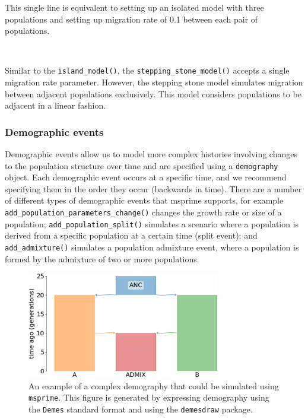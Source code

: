 \documentclass[graybox]{svmult}
\newcommand{\msprime}[0]{\texttt{msprime}}
\begin{document}
This single line is equivalent to setting up an isolated model with three populations
and setting up migration rate of 0.1 between each pair of populations.

\label{stepping-stone-model} \

Similar to the \texttt{island\_model()}, the \texttt{stepping\_stone\_model()}
accepts a single migration rate parameter. However, the stepping stone model simulates
migration between adjacent populations exclusively. This model considers populations to be
adjacent in a linear fashion.

\subsubsection{Demographic events}\label{demographic-events}

Demographic events allow us to model more complex histories involving
changes to the population structure over time and are specified using
a \texttt{demography} object. Each
demographic event occurs at a specific time, and we recommend specifying them
in the order they occur (backwards in time). There are a
number of different types of demographic events that msprime supports, for example
\texttt{add\_population\_parameters\_change()} changes the growth rate or size of a population;
\texttt{add\_population\_split()} simulates a scenario where a population is derived from a
specific population at a certain time (split event);
and \texttt{add\_admixture()} simulates a population admixture event, where a population is
formed by the admixture of two or more populations.

\begin{figure}[t]
\centering
\includegraphics[width=0.75\textwidth]{images/admixture.pdf}
\caption{\label{fig:complex-demography}An example of a complex demography that could be
simulated using \msprime. This figure is generated by expressing demography using the
\texttt{Demes} standard format and using the \texttt{demesdraw} package.}
\end{figure}
\end{document}
